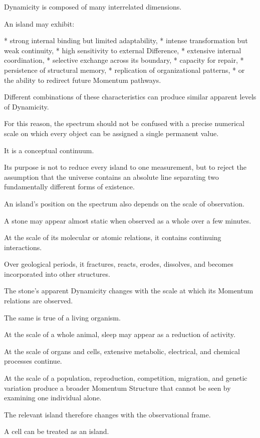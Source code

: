 Dynamicity is composed of many interrelated dimensions.

An island may exhibit:

* strong internal binding but limited adaptability,
* intense transformation but weak continuity,
* high sensitivity to external Difference,
* extensive internal coordination,
* selective exchange across its boundary,
* capacity for repair,
* persistence of structural memory,
* replication of organizational patterns,
* or the ability to redirect future Momentum pathways.

Different combinations of these characteristics can produce similar apparent levels of Dynamicity.

For this reason, the spectrum should not be confused with a precise numerical scale on which every object can be assigned a single permanent value.

It is a conceptual continuum.

Its purpose is not to reduce every island to one measurement, but to reject the assumption that the universe contains an absolute line separating two fundamentally different forms of existence.

An island’s position on the spectrum also depends on the scale of observation.

A stone may appear almost static when observed as a whole over a few minutes.

At the scale of its molecular or atomic relations, it contains continuing interactions.

Over geological periods, it fractures, reacts, erodes, dissolves, and becomes incorporated into other structures.

The stone’s apparent Dynamicity changes with the scale at which its Momentum relations are observed.

The same is true of a living organism.

At the scale of a whole animal, sleep may appear as a reduction of activity.

At the scale of organs and cells, extensive metabolic, electrical, and chemical processes continue.

At the scale of a population, reproduction, competition, migration, and genetic variation produce a broader Momentum Structure that cannot be seen by examining one individual alone.

The relevant island therefore changes with the observational frame.

A cell can be treated as an island.

